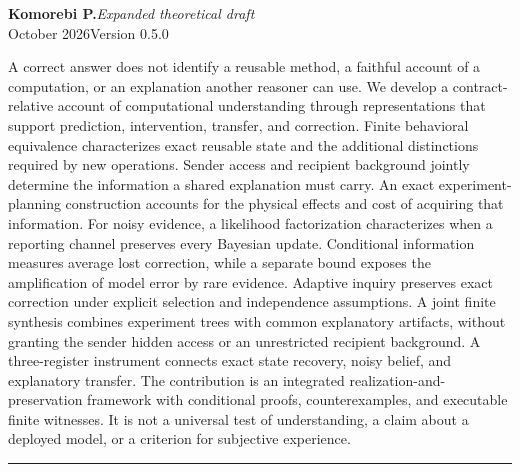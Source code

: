 \documentclass[11pt,letterpaper]{article}
\theoremstyle{plain}
\theoremstyle{definition}
\begin{document}
\hypersetup{pageanchor=false}
\begin{titlepage}
\thispagestyle{empty}
\vspace*{.25in}
\par
\vspace{.65in}
\vspace{.19in}
\vspace{.28in}
\noindent{\color{ink}\rule{\textwidth}{.85pt}}\par
\vspace{.16in}
\noindent\textbf{Komorebi P.}\hfill\textit{Expanded theoretical draft}\\
 October 2026\hfill Version 0.5.0\par
\vspace{.46in}
\par\smallskip
\noindent A correct answer does not identify a reusable method, a faithful account of a computation, or an explanation another reasoner can use. We develop a contract-relative account of computational understanding through representations that support prediction, intervention, transfer, and correction. Finite behavioral equivalence characterizes exact reusable state and the additional distinctions required by new operations. Sender access and recipient background jointly determine the information a shared explanation must carry. An exact experiment-planning construction accounts for the physical effects and cost of acquiring that information. For noisy evidence, a likelihood factorization characterizes when a reporting channel preserves every Bayesian update. Conditional information measures average lost correction, while a separate bound exposes the amplification of model error by rare evidence. Adaptive inquiry preserves exact correction under explicit selection and independence assumptions. A joint finite synthesis combines experiment trees with common explanatory artifacts, without granting the sender hidden access or an unrestricted recipient background. A three-register instrument connects exact state recovery, noisy belief, and explanatory transfer. The contribution is an integrated realization-and-preservation framework with conditional proofs, counterexamples, and executable finite witnesses. It is not a universal test of understanding, a claim about a deployed model, or a criterion for subjective experience.

\vfill
\noindent\rule{\textwidth}{.4pt}\par\smallskip
{}
\end{titlepage}
\hypersetup{pageanchor=true}
\begingroup\small\setlength{\parskip}{0pt}\tableofcontents\endgroup
\clearpage
\end{document}

